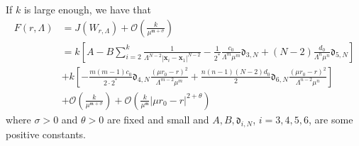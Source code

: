 \documentclass[11pt,a4paper]{amsart}
\begin{document}
\begin{proposition}\label{reduced}
If $k$ is large enough, we have that
$$\begin{aligned} F(r, \Lambda)&=J(W_{r, \Lambda})+ \mathcal O\left(\frac{k}{\mu^{\mathfrak m+\sigma}}\right)\\
&=k\left[A-B\sum_{i=2}^k\frac{1}{\Lambda^{N-2}|\mathbf{x}_i-\mathbf{x}_1|^{N-2}}-\frac{1}{2^*}\frac{c_0}{\Lambda^m \mu^m}\mathfrak d_{3, N}+(N-2)\frac{d_0}{\Lambda^n \mu^n}\mathfrak d_{5, N}\right]\\
&+k\left[-\frac{m(m-1)c_0}{2\cdot2^*}\mathfrak d_{4, N}\frac{(\mu r_0-r)^2}{\Lambda^{m-2}\mu^m}+\frac{n(n-1)(N-2)d_0}{2}\mathfrak d_{6, N}\frac{(\mu r_0-r)^2}{\Lambda^{n-2}\mu^n}\right]\\
&+\mathcal O\left(\frac{k}{\mu^{\mathfrak m+\sigma}}\right)  +\mathcal O\left(\frac{k}{\mu^{\mathfrak m}}|\mu r_0-r|^{2+\theta}\right)
\end{aligned}$$
where $\sigma>0$ and $\theta>0$ are fixed and small and $A,B,\mathfrak d_{i, N}$,  $i=3, 4, 5, 6$, are some positive constants. 
\end{proposition}
\end{document}
